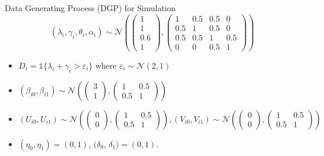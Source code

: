 \documentclass[aspectratio=1610, 9pt]{beamer}
\begin{document}
\begin{frame}{Data Generating Process (DGP) for Simulation} \label{DGP}
$$
(\lambda_{i},\gamma_{i},\theta_{i},\alpha_{i})\sim\mathcal{N}\left(\left(\begin{array}{c}
1\\
1\\
0.6\\
1
\end{array}\right),\left(\begin{array}{cccc}
1 & 0.5 & 0.5 & 0\\
0.5 & 1 & 0.5 & 0\\
0.5 & 0.5 & 1 & 0.5\\
0 & 0 & 0.5 & 1
\end{array}\right)\right)
$$


\begin{itemize}
     \item $D_{i}=\mathds{1}\{\lambda_{i}+\gamma_{i}>\varepsilon_{i}\}$ where $\varepsilon_{i}\sim\mathcal{N}(2,1)$
     
    \item $(\beta_{i0},\beta_{i1})\sim\mathcal{N}\left(\left(\begin{array}{c}
3\\
1
\end{array}\right),
 \left(\begin{array}{cc}
1 & 0.5\\
0.5 & 1
\end{array}\right)\right)$

    \item $(U_{i0},U_{i1})\sim\mathcal{N}\left(\left(\begin{array}{c}
0\\
0
\end{array}\right),
\left(\begin{array}{cc}
1 & 0.5\\
0.5 & 1
\end{array}\right)\right), (V_{i0},V_{i1})\sim\mathcal{N}\left(\left(\begin{array}{c}
0\\
0
\end{array}\right),\left(\begin{array}{cc}
1 & 0.5\\
0.5 & 1
\end{array}\right)\right)$
 \item  $(\eta_{0},\eta_{1})=(0,1)$, $(\delta_{0}$, $\delta_{1})=(0,1)$.
   
\end{itemize}

\vspace{0.4cm}
\hyperlink{Bias}{}

\end{frame}
\end{document}
